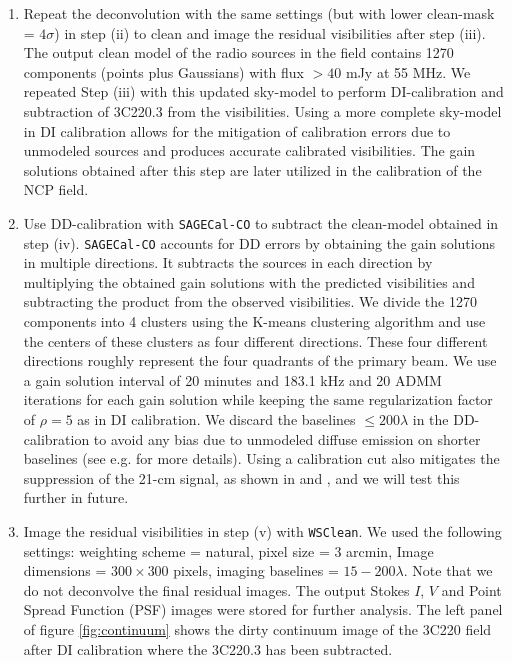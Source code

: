 \documentclass[fleqn,usenatbib]{mnras}
\begin{document}
\begin{enumerate}
\item Repeat the deconvolution with the same settings (but with lower clean-mask = $4\sigma$) in step (ii) to clean and image the residual visibilities after step (iii). The output clean model of the radio sources in the field contains 1270 components (points plus Gaussians) with flux $> 40$ mJy at 55 MHz. We repeated Step (iii) with this updated sky-model to perform DI-calibration and subtraction of 3C220.3 from the visibilities. Using a more complete sky-model in DI calibration allows for the mitigation of calibration errors due to unmodeled sources and produces accurate calibrated visibilities. The gain solutions obtained after this step are later utilized in the calibration of the NCP field.

\item Use DD-calibration with \texttt{SAGECal-CO} to subtract the clean-model obtained in step (iv). \texttt{SAGECal-CO} accounts for DD errors by obtaining the gain solutions in multiple directions. It subtracts the sources in each direction by multiplying the obtained gain solutions with the predicted visibilities and subtracting the product from the observed visibilities. We divide the 1270 components into 4 clusters using the K-means clustering algorithm \citep{kazemi2013a} and use the centers of these clusters as four different directions. These four different directions roughly represent the four quadrants of the primary beam. We use a gain solution interval of 20 minutes and 183.1 kHz and 20 ADMM iterations for each gain solution while keeping the same regularization factor of $\rho=5$ \citep{yatawatta2016} as in DI calibration. We discard the baselines $\leq 200\lambda$ in the DD-calibration to avoid any bias due to unmodeled diffuse emission on shorter baselines (see e.g. \citealt{patil2016,barry2016,ewall-wice2017,gehlot2018} for more details). Using a calibration cut also mitigates the suppression of the 21-cm signal, as shown in \cite{patil2017} and \cite{sardarabadi2018}, and we will test this further in future. 

\item Image the residual visibilities in step (v) with \texttt{WSClean}. We used the following settings: weighting scheme = natural, pixel size = 3 arcmin, Image dimensions = $300\times 300$ pixels, imaging baselines = $15 - 200 \lambda$. Note that we do not deconvolve the final residual images. The output Stokes $I$, $V$ and Point Spread Function (PSF) images were stored for further analysis. The left panel of figure \ref{fig:continuum} shows the dirty continuum image of the 3C220 field after DI calibration where the 3C220.3 has been subtracted.

\end{enumerate}
 
\end{document}
